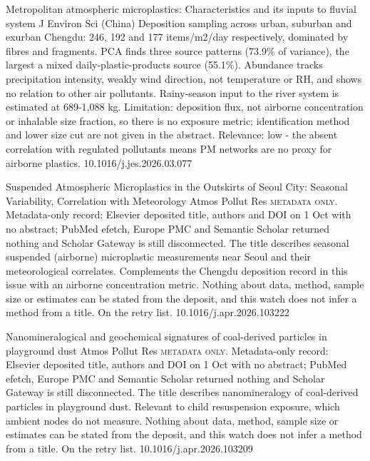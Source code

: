 \documentclass[10pt]{article}
\begin{document}
{Metropolitan atmospheric microplastics: Characteristics and its inputs to fluvial system}
{J Environ Sci (China)}
{Deposition sampling across urban, suburban and exurban Chengdu: 246, 192 and 177 items/m2/day respectively, dominated by fibres and fragments. PCA finds three source patterns (73.9\% of variance), the largest a mixed daily-plastic-products source (55.1\%). Abundance tracks precipitation intensity, weakly wind direction, not temperature or RH, and shows no relation to other air pollutants. Rainy-season input to the river system is estimated at 689-1,088 kg. Limitation: deposition flux, not airborne concentration or inhalable size fraction, so there is no exposure metric; identification method and lower size cut are not given in the abstract. Relevance: low - the absent correlation with regulated pollutants means PM networks are no proxy for airborne plastics.}
{10.1016/j.jes.2026.03.077}

{Suspended Atmospheric Microplastics in the Outskirts of Seoul City: Seasonal Variability, Correlation with Meteorology}
{Atmos Pollut Res}
{\textsc{metadata only.} Metadata-only record: Elsevier deposited title, authors and DOI on 1 Oct with no abstract; PubMed efetch, Europe PMC and Semantic Scholar returned nothing and Scholar Gateway is still disconnected. The title describes seasonal suspended (airborne) microplastic measurements near Seoul and their meteorological correlates. Complements the Chengdu deposition record in this issue with an airborne concentration metric. Nothing about data, method, sample size or estimates can be stated from the deposit, and this watch does not infer a method from a title. On the retry list.}
{10.1016/j.apr.2026.103222}

{Nanomineralogical and geochemical signatures of coal-derived particles in playground dust}
{Atmos Pollut Res}
{\textsc{metadata only.} Metadata-only record: Elsevier deposited title, authors and DOI on 1 Oct with no abstract; PubMed efetch, Europe PMC and Semantic Scholar returned nothing and Scholar Gateway is still disconnected. The title describes nanomineralogy of coal-derived particles in playground dust. Relevant to child resuspension exposure, which ambient nodes do not measure. Nothing about data, method, sample size or estimates can be stated from the deposit, and this watch does not infer a method from a title. On the retry list.}
{10.1016/j.apr.2026.103209}
\end{document}
